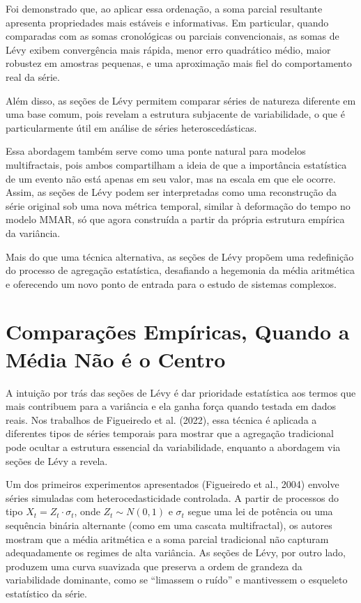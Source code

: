 \documentclass[
]{agujournal2019}
\begin{document}
Foi demonstrado que, ao aplicar essa ordenação, a soma parcial
resultante apresenta propriedades mais estáveis e informativas. Em
particular, quando comparadas com as somas cronológicas ou parciais
convencionais, as somas de Lévy exibem convergência mais rápida, menor
erro quadrático médio, maior robustez em amostras pequenas, e uma
aproximação mais fiel do comportamento real da série.

Além disso, as seções de Lévy permitem comparar séries de natureza
diferente em uma base comum, pois revelam a estrutura subjacente de
variabilidade, o que é particularmente útil em análise de séries
heteroscedásticas.

Essa abordagem também serve como uma ponte natural para modelos
multifractais, pois ambos compartilham a ideia de que a importância
estatística de um evento não está apenas em seu valor, mas na escala em
que ele ocorre. Assim, as seções de Lévy podem ser interpretadas como
uma reconstrução da série original sob uma nova métrica temporal,
similar à deformação do tempo no modelo MMAR, só que agora construída a
partir da própria estrutura empírica da variância.

Mais do que uma técnica alternativa, as seções de Lévy propõem uma
redefinição do processo de agregação estatística, desafiando a hegemonia
da média aritmética e oferecendo um novo ponto de entrada para o estudo
de sistemas complexos.

\section{Comparações Empíricas, Quando a Média Não é o
Centro}\label{comparauxe7uxf5es-empuxedricas-quando-a-muxe9dia-nuxe3o-uxe9-o-centro}

A intuição por trás das seções de Lévy é dar prioridade estatística aos
termos que mais contribuem para a variância e ela ganha força quando
testada em dados reais. Nos trabalhos de Figueiredo et al. (2022), essa
técnica é aplicada a diferentes tipos de séries temporais para mostrar
que a agregação tradicional pode ocultar a estrutura essencial da
variabilidade, enquanto a abordagem via seções de Lévy a revela.

Um dos primeiros experimentos apresentados (Figueiredo et al., 2004)
envolve séries simuladas com heterocedasticidade controlada. A partir de
processos do tipo \(X_t = Z_t \cdot \sigma_t\), onde \(Z_t \sim N(0,1)\)
e \(\sigma_t\) segue uma lei de potência ou uma sequência binária
alternante (como em uma cascata multifractal), os autores mostram que a
média aritmética e a soma parcial tradicional não capturam adequadamente
os regimes de alta variância. As seções de Lévy, por outro lado,
produzem uma curva suavizada que preserva a ordem de grandeza da
variabilidade dominante, como se ``limassem o ruído'' e mantivessem o
esqueleto estatístico da série.
\end{document}
